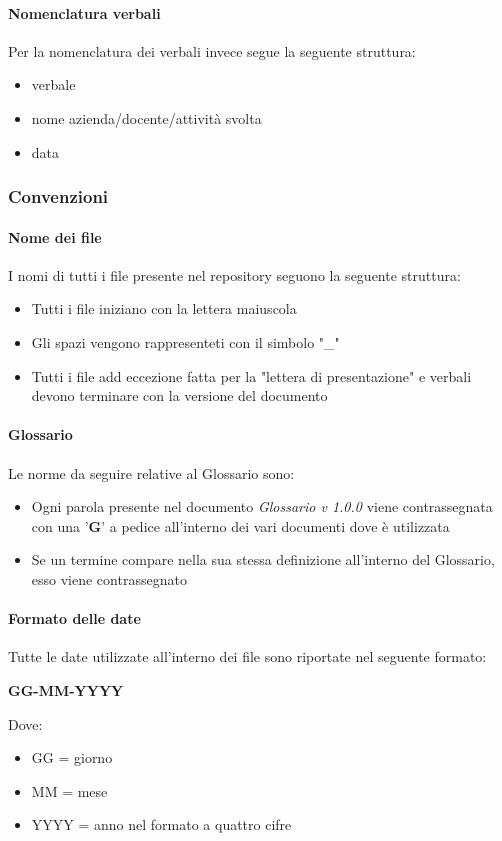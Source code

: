 \documentclass[12pt]{article}
\begin{document}
\paragraph{Nomenclatura verbali}
Per la nomenclatura dei verbali invece segue la seguente struttura:
\begin{itemize}
    \item verbale
    \item nome azienda/docente/attività svolta
    \item data
\end{itemize}
\subsubsection{Convenzioni}
\paragraph{Nome dei file}
I nomi di tutti i file presente nel repository seguono la seguente struttura:
\begin{itemize}
    \item Tutti i file iniziano con la lettera maiuscola
    \item Gli spazi vengono rappresenteti con il simbolo "\_"
    \item Tutti i file add eccezione fatta per la "lettera di presentazione" e verbali devono terminare con la versione del documento
\end{itemize}

\paragraph{Glossario}
Le norme da seguire relative al Glossario sono:
\begin{itemize}
    \item Ogni parola presente nel documento \textit{Glossario v 1.0.0} viene contrassegnata con una '\textbf{G}' a
    pedice all'interno dei vari documenti dove è utilizzata
    \item Se un termine compare nella sua stessa definizione all'interno del Glossario, esso viene contrassegnato

\end{itemize}
    
\paragraph{Formato delle date}
Tutte le date utilizzate all'interno dei file sono riportate nel seguente formato:
\begin{center}
    \textbf{GG-MM-YYYY}

    Dove:
    \begin{itemize}
        \item GG = giorno
        \item MM = mese
        \item YYYY = anno nel formato a quattro cifre
    \end{itemize}
\end{center}
\end{document}

